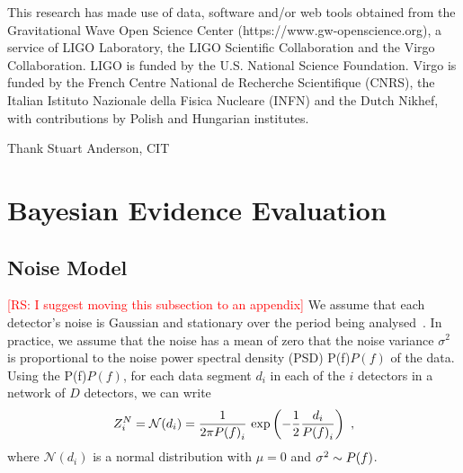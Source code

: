 \documentclass[%
 nofootinbib,
 amsmath,amssymb,
 aps,
 twocolumn
]{revtex4-2}
\newcommand{\mathcmd}[1]{{\sc \relax\ifmmode#1\else $#1$\fi}\xspace}
\newcommand{\psd}{\mathcmd{P(f)}}
\newcommand{\rs}[1]{\textcolor{red}{[RS: #1]}}
\begin{document}


\begin{acknowledgments}

This research has made use of data, software and/or web tools obtained from the Gravitational Wave Open Science Center (https://www.gw-openscience.org), a service of LIGO Laboratory, the LIGO Scientific Collaboration and the Virgo Collaboration. LIGO is funded by the U.S. National Science Foundation. Virgo is funded by the French Centre National de Recherche Scientifique (CNRS), the Italian Istituto Nazionale della Fisica Nucleare (INFN) and the Dutch Nikhef, with contributions by Polish and Hungarian institutes.

Thank Stuart Anderson, CIT



\end{acknowledgments}

\appendix



\section{Bayesian Evidence Evaluation}
\subsection{Noise Model}
\rs{I suggest moving this subsection to an appendix}
We assume that each detector's noise is Gaussian and stationary over the period being analysed~\cite{ligo_psd}. In practice, we assume that the noise has a mean of zero that the noise variance $\sigma^2$ is proportional to the noise power spectral density (PSD) \psd of the data. Using the \psd, for each data segment $d_i$ in each of the $i$ detectors in a network of $D$ detectors, we can write 
\begin{equation}
\label{eq:zn}
Z^N_i = \mathcal{N}(d_i) = \frac{1}{2\pi \psd_i} \ \text{exp}\left(-\frac{1}{2} \frac{d_i}{\psd_i} \right) \ ,
\end{equation}
where $\mathcal{N}(d_i)$ is a normal distribution with $\mu=0$ and $\sigma^2\sim \psd$. 
\end{document}
